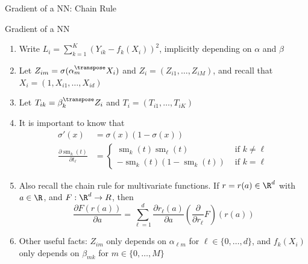 \documentclass[9pt,xcolor=table]{beamer}
\newcommand{\sm}{\operatorname{sm}}
\begin{document}
\begin{frame}{Gradient of a NN: Chain Rule}
		\textbf{}
\end{frame}
\begin{frame}{Gradient of a NN}

\begin{enumerate}
\item Write $L_i = \sum_{k=1}^K (Y_{ik} - f_k(X_i))^2$, implicitly depending on $\alpha$ and $\beta$

\item Let $Z_{im} =\sigma(\alpha_m^{\transpose} X_i)$ and $Z_i = (Z_{i1},\ldots, Z_{iM})$, and recall that $X_i = (1, X_{i1},\ldots, X_{id})$
\item Let $T_{ik} = \beta_{k}^{\transpose} Z_i$ and $T_i = (T_{i1},\ldots, T_{iK})$

\item It is important to know that
\begin{align*}
\sigma'(x)& = \sigma(x)(1-\sigma(x))\\
\frac{\partial \sm_k(t)}{\partial t_{\ell}} &= \begin{cases}\sm_k(t)\sm_{\ell}(t) & \text{ if } k\neq \ell\\
-\sm_k(t)(1-\sm_k(t)) & \text{ if } k=\ell\end{cases}
\end{align*}
\item Also recall the chain rule for multivariate functions. If $r = r(a) \in \R^d$ with $a \in \R$,  and $F:\R^d \to R$, then 
$$\frac{\partial F(r(a))}{ \partial a} =  \sum_{\ell=1}^d \frac{\partial r_\ell(a)}{\partial a} \left(\frac{\partial }{ \partial r_{\ell}} F\right)(r(a))$$
\item Other useful facts: $Z_{im}$ only depends on $\alpha_{\ell m}$ for $\ell \in \{0,\ldots, d\}$, and $f_k(X_i)$ only depends on $\beta_{mk}$ for $m\in \{0,\ldots, M\}$

\end{enumerate}

\end{frame}
\end{document}
